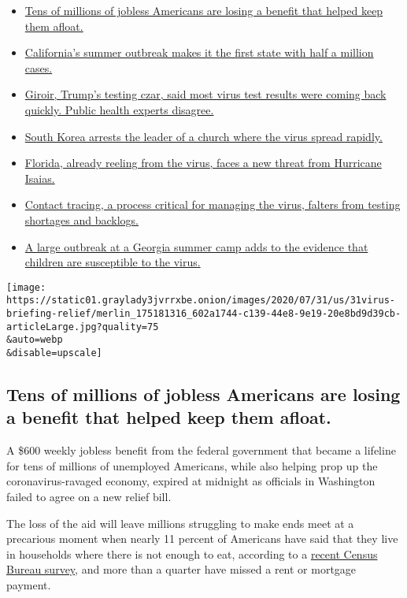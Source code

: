 \begin{itemize}
\tightlist
\item
  \protect\hyperlink{link-7c4d159d}{Tens of millions of jobless
  Americans are losing a benefit that helped keep them afloat.}
\item
  \protect\hyperlink{link-4e17d805}{California's summer outbreak makes
  it the first state with half a million cases.}
\item
  \protect\hyperlink{link-65fa7f74}{Giroir, Trump's testing czar, said
  most virus test results were coming back quickly. Public health
  experts disagree.}
\item
  \protect\hyperlink{link-2b88e858}{South Korea arrests the leader of a
  church where the virus spread rapidly.}
\item
  \protect\hyperlink{link-3bb771a7}{Florida, already reeling from the
  virus, faces a new threat from Hurricane Isaias.}
\item
  \protect\hyperlink{link-747b61fb}{Contact tracing, a process critical
  for managing the virus, falters from testing shortages and backlogs.}
\item
  \protect\hyperlink{link-19b57b6f}{A large outbreak at a Georgia summer
  camp adds to the evidence that children are susceptible to the virus.}
\end{itemize}

\texttt{[image: https://static01.graylady3jvrrxbe.onion/images/2020/07/31/us/31virus-briefing-relief/merlin\_175181316\_602a1744-c139-44e8-9e19-20e8bd9d39cb-articleLarge.jpg?quality=75\\\&auto=webp\\\&disable=upscale]}

\hypertarget{tens-of-millions-of-jobless-americans-are-losing-a-benefit-that-helped-keep-them-afloat}{%
\subsection{Tens of millions of jobless Americans are losing a benefit
that helped keep them
afloat.}\label{tens-of-millions-of-jobless-americans-are-losing-a-benefit-that-helped-keep-them-afloat}}

A \$600 weekly jobless benefit from the federal government that became a
lifeline for tens of millions of unemployed Americans, while also
helping prop up the coronavirus-ravaged economy, expired at midnight as
officials in Washington failed to agree on a new relief bill.

The loss of the aid will leave millions struggling to make ends meet at
a precarious moment when nearly 11 percent of Americans have said that
they live in households where there is not enough to eat, according to a
\href{https://www.census.gov/programs-surveys/household-pulse-survey/data.html?utm_campaign=20200727mspuls1ccdtanl\&utm_medium=email\&utm_source=govdelivery}{recent
Census Bureau survey}, and more than a quarter have missed a rent or
mortgage payment.

